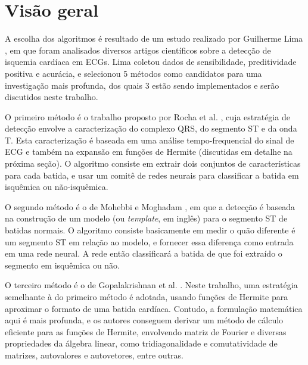 
\section{Visão geral}
\label{sec:section1}

A escolha dos algoritmos é resultado de um estudo realizado por Guilherme Lima \cite{Lima01}, em que foram analisados diversos artigos científicos sobre a detecção de isquemia cardíaca em ECGs. Lima coletou dados de sensibilidade, preditividade positiva e acurácia, e selecionou 5 métodos como candidatos para uma investigação mais profunda, dos quais 3 estão sendo implementados e serão discutidos neste trabalho.

O primeiro método é o trabalho proposto por Rocha et al. \cite{Rocha10}, cuja estratégia de detecção envolve a caracterização do complexo QRS, do segmento ST e da onda T. Esta caracterização é baseada em uma análise tempo-frequencial do sinal de ECG e também na expansão em funções de Hermite (discutidas em detalhe na próxima seção). O algoritmo consiste em extrair dois conjuntos de características para cada batida, e usar um comitê de redes neurais para classificar a batida em isquêmica ou não-isquêmica.

O segundo método é o de Mohebbi e Moghadam \cite{Mohebbi07}, em que a detecção é baseada na construção de um modelo (ou \emph{template}, em inglês) para o segmento ST de batidas normais. O algoritmo consiste basicamente em medir o quão diferente é um segmento ST em relação ao modelo, e fornecer essa diferença como entrada em uma rede neural. A rede então classificará a batida de que foi extraído o segmento em isquêmica ou não.

O terceiro método é o de Gopalakrishnan et al. \cite{Gopalak04}. Neste trabalho, uma estratégia semelhante à do primeiro método é adotada, usando funções de Hermite para aproximar o formato de uma batida cardíaca. Contudo, a formulação matemática aqui é mais profunda, e os autores conseguem derivar um método de cálculo eficiente para as funções de Hermite, envolvendo matriz de Fourier e diversas propriedades da álgebra linear, como tridiagonalidade e comutatividade de matrizes, autovalores e autovetores, entre outras.